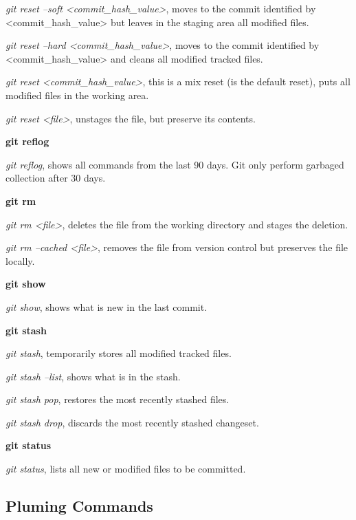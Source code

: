 \begin{refsection}
\noindent\emph{git reset --soft <commit\_hash\_value>}, moves to the commit identified by <commit\_hash\_value> but leaves in the staging area all modified files.

\noindent\emph{git reset --hard <commit\_hash\_value>}, moves to the commit identified by <commit\_hash\_value> and cleans all modified tracked files.

\noindent\emph{git reset <commit\_hash\_value>}, this is a mix reset (is the default reset), puts all modified files in the working area.

\noindent\emph{git reset <file>}, unstages the file, but preserve its contents.

\vspace*{5mm} \noindent \textbf{git reflog}

\noindent\emph{git reflog}, shows all commands from the last 90 days. Git only perform garbaged collection after 30 days.

\vspace*{5mm} \noindent \textbf{git rm}

\noindent\emph{git rm <file>}, deletes the file from the working directory and stages the deletion.

\noindent\emph{git rm --cached <file>}, removes the file from version control but preserves the file locally.

\vspace*{5mm} \noindent \textbf{git show}

\noindent\emph{git show}, shows what is new in the last commit.

\vspace*{5mm} \noindent  \textbf{git stash}

\noindent\emph{git stash}, temporarily stores all modified tracked files.

\noindent\emph{git stash --list}, shows what is in the stash.

\noindent\emph{git stash pop}, restores the most recently stashed files.

\noindent\emph{git stash drop}, discards the most recently stashed changeset.

\vspace*{5mm} \noindent \textbf{git status}

\noindent\emph{git status}, lists all new or modified files to be committed.

\subsection{Pluming Commands}


\end{refsection}
